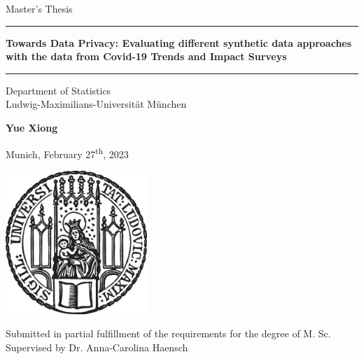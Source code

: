 \documentclass[12pt]{article}
\newcommand{\mytitle}{Towards Data Privacy: Evaluating different synthetic data approaches with the data from Covid-19 Trends and Impact Surveys}
\newcommand{\myname}{Yue Xiong}
\newcommand{\mysupervisor}{Dr. Anna-Carolina Haensch}
\begin{document}
 
\begin{titlepage}
\begin{center}
    
\LARGE
Master's Thesis
    
\vspace{0.5cm}
      
\rule{\textwidth}{1.5pt}
\LARGE
\textbf{\mytitle}
\rule{\textwidth}{1.5pt}
   
\vspace{0.5cm}
      
\large
Department of Statistics \\
Ludwig-Maximilians-Universität München 

\vfill

\Large
\textbf{\myname}

\vfill

\large
Munich, February 27\textsuperscript{th}, 2023
      
\vfill
\includegraphics[width = 0.4\textwidth]{sigillum.png}
\vfill

\normalsize
Submitted in partial fulfillment of the requirements for the degree of M. Sc.
\\

Supervised by \mysupervisor

\end{center}
\end{titlepage}


\newpage
\end{document}
